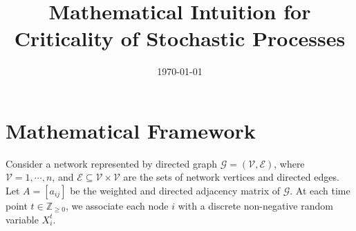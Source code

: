 \documentclass[superscriptaddress]{revtex4-1}
\newcommand{\mc}{\mathcal}
\begin{document}
\title{Mathematical Intuition for Criticality of Stochastic Processes}
\date{\today}

\maketitle


\section{Mathematical Framework}
Consider a network represented by directed graph $\mc G = (\mc V, \mc E)$, where $\mc V = {1, \dotsm, n}$, and $\mc E \subseteq \mc V \times \mc V$ are the sets of network vertices and directed edges. Let $A = [a_{ij}]$ be the weighted and directed adjacency matrix of $\mc G$. At each time point $t \in \mathbb{Z}_{\geq 0}$, we associate each node $i$ with a discrete non-negative random variable $X_i^t$.
\end{document}
